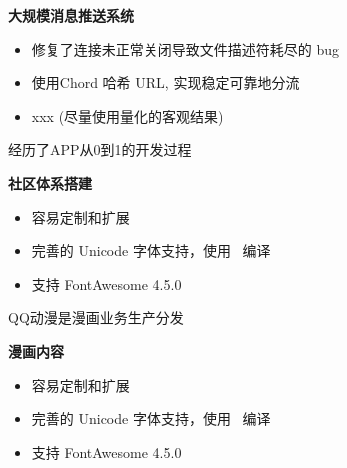 \documentclass{resume}
\begin{document}
\begin{onehalfspacing}
\textbf{大规模消息推送系统}
\begin{itemize}
  \item 修复了连接未正常关闭导致文件描述符耗尽的 bug
  \item 使用Chord 哈希 URL, 实现稳定可靠地分流
  \item xxx (尽量使用量化的客观结果)
\end{itemize}
\end{onehalfspacing}

{经历了APP从0到1的开发过程} \\
\begin{onehalfspacing}
\textbf{社区体系搭建}
\begin{itemize}
  \item 容易定制和扩展
  \item 完善的 Unicode 字体支持，使用 \XeLaTeX\ 编译
  \item 支持 FontAwesome 4.5.0
\end{itemize}
\end{onehalfspacing}

{QQ动漫是漫画业务生产分发}\\
\begin{onehalfspacing}
\textbf{漫画内容}
\begin{itemize}
  \item 容易定制和扩展
  \item 完善的 Unicode 字体支持，使用 \XeLaTeX\ 编译
  \item 支持 FontAwesome 4.5.0
\end{itemize}
\end{onehalfspacing}




%
%
\end{document}
